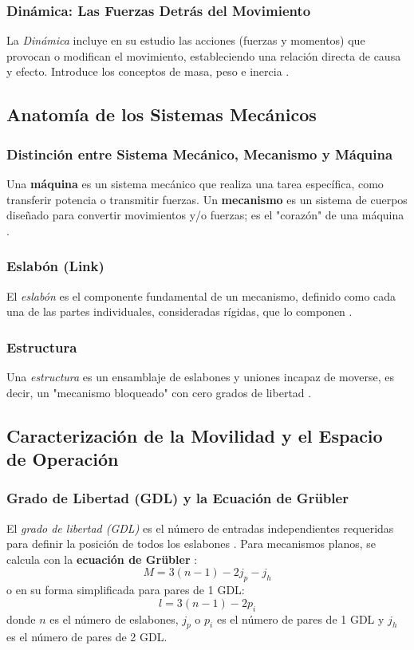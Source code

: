 \documentclass[12pt,a4paper]{article}
\begin{document}
\subsubsection{Dinámica: Las Fuerzas Detrás del Movimiento}
La \textit{Dinámica} incluye en su estudio las acciones (fuerzas y momentos) que provocan o modifican el movimiento, estableciendo una relación directa de causa y efecto. Introduce los conceptos de masa, peso e inercia \cite{lopez-cajun-2008}.

\subsection{Anatomía de los Sistemas Mecánicos}

\subsubsection{Distinción entre Sistema Mecánico, Mecanismo y Máquina}
Una \textbf{máquina} es un sistema mecánico que realiza una tarea específica, como transferir potencia o transmitir fuerzas. Un \textbf{mecanismo} es un sistema de cuerpos diseñado para convertir movimientos y/o fuerzas; es el "corazón" de una máquina \cite{lopez-cajun-2008}.

\subsubsection{Eslabón (Link)}
El \textit{eslabón} es el componente fundamental de un mecanismo, definido como cada una de las partes individuales, consideradas rígidas, que lo componen \cite{lopez-cajun-2008}.

\subsubsection{Estructura}
Una \textit{estructura} es un ensamblaje de eslabones y uniones incapaz de moverse, es decir, un "mecanismo bloqueado" con cero grados de libertad \cite{lopez-cajun-2008}.

\subsection{Caracterización de la Movilidad y el Espacio de Operación}

\subsubsection{Grado de Libertad (GDL) y la Ecuación de Grübler}
El \textit{grado de libertad (GDL)} es el número de entradas independientes requeridas para definir la posición de todos los eslabones \cite{lopez-cajun-2008}. Para mecanismos planos, se calcula con la \textbf{ecuación de Grübler} \cite{lopez-cajun-2008}:
\[ M = 3(n-1) - 2j_p - j_h \]
o en su forma simplificada para pares de 1 GDL:
\[ l = 3(n-1) - 2p_i \]
donde $n$ es el número de eslabones, $j_p$ o $p_i$ es el número de pares de 1 GDL y $j_h$ es el número de pares de 2 GDL.
\end{document}
